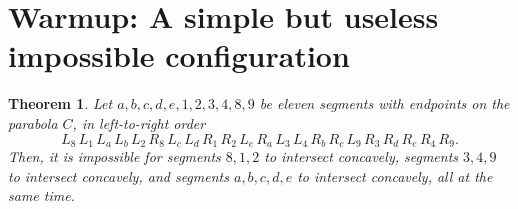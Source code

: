 \documentclass[11pt]{article}
\newtheorem{theorem}{Theorem}[section]
\theoremstyle{definition}
\theoremstyle{remark}
\begin{document}
\section{Warmup: A simple but useless impossible configuration}\label{sec_useless_forbidden}

\begin{theorem}\label{thm_useless_impossible}
Let $a,b,c,d,e,1,2,3,4,8,9$ be eleven segments with endpoints on the parabola $C$, in left-to-right order
\begin{equation}\label{eq_useless_LR}
L_8\, L_1\, L_a\, L_b\, L_2\, R_8\, L_c\, L_d\, R_1\, R_2\, L_e\, R_a\, L_3\, L_4\, R_b\, R_c\, L_9\, R_3\, R_d\, R_e\, R_4\, R_9.
\end{equation}
Then, it is impossible for segments $8,1,2$ to intersect concavely, segments $3,4,9$ to intersect concavely, and segments $a,b,c,d,e$ to intersect concavely, all at the same time.
\end{theorem}
\end{document}
